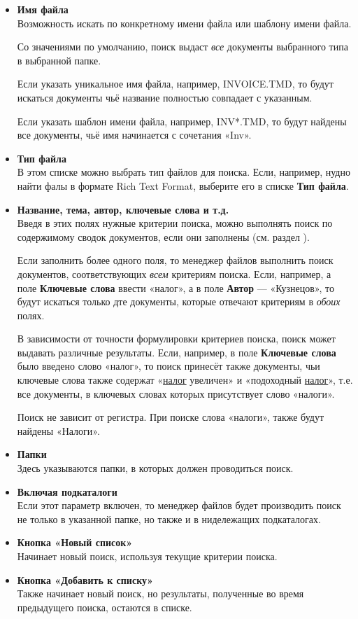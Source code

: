 ﻿\documentclass[a4paper,10pt]{article}
\begin{document}
\begin{itemize}
 \item \textbf{Имя файла}\\
 Возможность искать по конкретному имени файла или шаблону имени файла.
 
 Со значениями по умолчанию, поиск выдаст \textit{все} документы выбранного типа в выбранной папке.
 
 Если указать уникальное имя файла, например, INVOICE.TMD, то будут искаться документы чьё название полностью совпадает с указанным.
 
 Если указать шаблон имени файла, например, INV*.TMD, то будут найдены все документы, чьё имя начинается с сочетания «Inv».
 \item \textbf{Тип файла}\\
 В этом списке можно выбрать тип файлов для поиска. Если, например, нудно найти фалы в формате Rich Text Format, выберите его в списке \textbf{Тип файла}.
 \item \textbf{Название, тема, автор, ключевые слова и т.д.}\\
 Введя в этих полях нужные критерии поиска, можно выполнять поиск по содержимому сводок документов, если они заполнены (см. раздел ).
 
 Если заполнить более одного поля, то менеджер файлов выполнить поиск документов, соответствующих \textit{всем} критериям поиска. Если, например, а поле \textbf{Ключевые слова} ввести «налог», а в поле \textbf{Автор} — «Кузнецов», то будут искаться только дте документы, которые отвечают критериям в \textit{обоих} полях.
 
 В зависимости от точности формулировки критериев поиска, поиск может выдавать различные результаты. Если, например, в поле \textbf{Ключевые слова} было введено слово «налог», то поиск принесёт также документы, чьи ключевые слова также содержат «\underline{налог} увеличен» и «подоходный \underline{налог}», т.е. все документы, в ключевых словах которых присутствует слово «налоги».
 
 Поиск не зависит от регистра. При поиске слова «налоги», также будут найдены «Налоги».
 
 \item \textbf{Папки}\\
 Здесь указываются папки, в которых должен проводиться поиск.
 
 \item \textbf{Включая подкаталоги}\\
 Если этот параметр включен, то менеджер файлов будет производить поиск не только в указанной папке, но также и в нидележащих подкаталогах.
 \item \textbf{Кнопка «Новый список»}\\
 Начинает новый поиск, используя текущие критерии поиска.
 \item \textbf{Кнопка «Добавить к списку»}\\
 Также начинает новый поиск, но результаты, полученные во время предыдущего поиска, остаются в списке.
\end{itemize}
\end{document}

